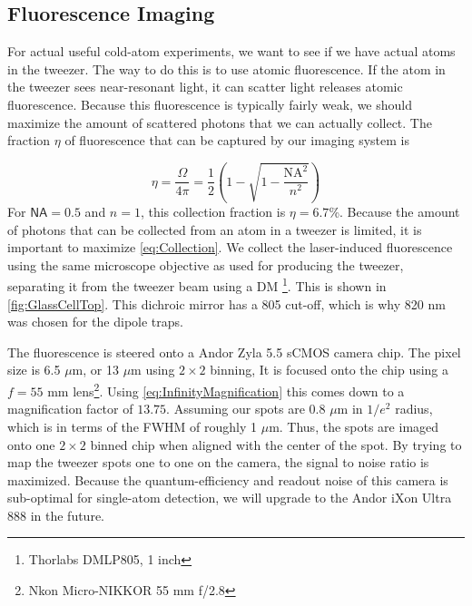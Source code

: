 \subsection{Fluorescence Imaging}

For actual useful cold-atom experiments, we want to see if we have actual atoms in the tweezer. 
The way to do this is to use atomic fluorescence.
If the atom in the tweezer sees near-resonant light, it can scatter light releases atomic fluorescence. 
Because this fluorescence is typically fairly weak, we should maximize the amount of scattered photons that we can actually collect. 
The fraction $\eta$ of fluorescence that can be captured by our imaging system is 

\begin{equation}\label{eq:Collection}
    \eta = \frac{\Omega}{4\pi} = 
    \frac{1}{2}\left(1-\sqrt{1-\frac{\text{NA}^2}{n^2}}\right)
\end{equation}
For $\textsf{NA}=0.5$ and $n=1$, this collection fraction is $\eta =6.7$\%. 
Because the amount of photons that can be collected from an atom in a tweezer is limited, it is important to maximize \cref{eq:Collection}.
We collect the laser-induced fluorescence using the same microscope objective as used for producing the tweezer, separating it from the tweezer beam using a \ac{DM} \footnote{Thorlabs DMLP805, 1 inch}.
This is shown in \cref{fig:GlassCellTop}.
This dichroic mirror has a 805 cut-off, which is why 820 nm was chosen for the dipole traps.

The fluorescence is steered onto a Andor Zyla 5.5 sCMOS camera chip.
The pixel size is 6.5 $\mu$m, or 13 $\mu$m using $2\times2$ binning, 
It is focused onto the chip using a $f= 55$ mm lens\footnote{Nkon Micro-NIKKOR 55 mm f/2.8}.
Using \cref{eq:InfinityMagnification} this comes down to a magnification factor of $13.75$.
Assuming our spots are $0.8$ $\mu$m in $1/e^2$ radius, which is in terms of the \ac{FWHM} of roughly 1 $\mu$m. 
Thus, the spots are imaged onto one $2\times2$ binned chip when aligned with the center of the spot.
By trying to map the tweezer spots one to one on the camera, the signal to noise ratio is maximized. 
Because the quantum-efficiency and readout noise of this camera is sub-optimal for single-atom detection, we will upgrade to the Andor iXon Ultra 888 in the future. 

